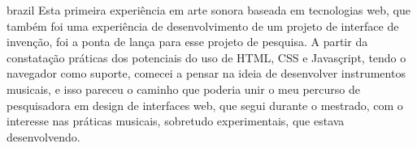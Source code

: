 \begin{otherlanguage*}{brazil}
Esta primeira experiência em arte sonora baseada em tecnologias web, que também foi uma experiência de desenvolvimento de um projeto de interface de invenção, foi a ponta de lança para esse projeto de pesquisa. A partir da constatação práticas dos potenciais do uso de HTML, CSS e Javasçript, tendo o navegador como suporte, comecei a pensar na ideia de desenvolver instrumentos musicais, e isso pareceu o caminho que poderia unir o meu percurso de pesquisadora em design de interfaces web, que segui durante o mestrado, com o interesse nas práticas musicais, sobretudo experimentais, que estava desenvolvendo.


    \newpage

\end{otherlanguage*}

